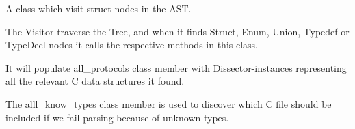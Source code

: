 \documentclass[A4paper,10pt,english]{sphinxmanual}
\begin{document}
\begin{fulllineitems}
\label{devel/code:cparser.StructVisitor}
A class which visit struct nodes in the AST.

The Visitor traverse the Tree, and when it finds Struct, Enum, Union,
Typedef or TypeDecl nodes it calls the respective methods in this class.

It will populate all\_protocols class member with Dissector-instances
representing all the relevant C data structures it found.

The alll\_know\_types class member is used to discover which C file
should be included if we fail parsing because of unknown types.

\begin{fulllineitems}
\label{devel/code:cparser.StructVisitor.all_protocols}
\end{fulllineitems}


\begin{fulllineitems}
\label{devel/code:cparser.StructVisitor.all_known_types}
\end{fulllineitems}


\begin{fulllineitems}
\label{devel/code:cparser.StructVisitor._last_visitor}
\end{fulllineitems}


\begin{fulllineitems}
\label{devel/code:cparser.StructVisitor._last_diss}
\end{fulllineitems}


\begin{fulllineitems}
\label{devel/code:cparser.StructVisitor._last_proto}
\end{fulllineitems}


\end{fulllineitems}
\end{document}
